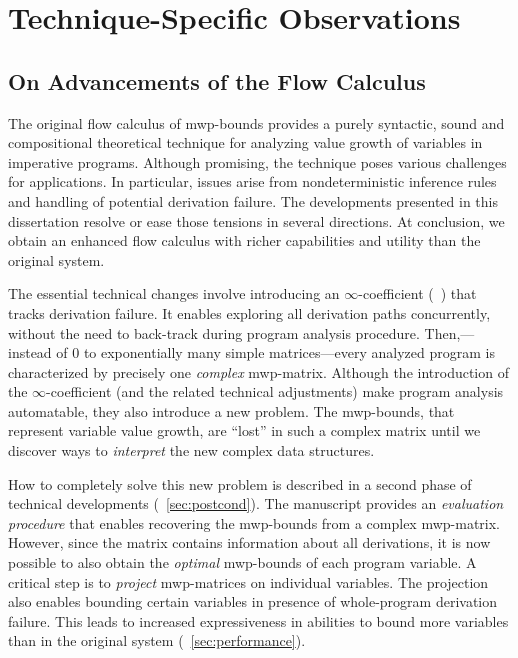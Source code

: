 
\section{Technique-Specific Observations}
\label{sec:res-specific}

\subsection{On Advancements of the Flow Calculus}
\label{subsec:res-flow-calc}

The original flow calculus of mwp-bounds provides a purely syntactic, sound and compositional theoretical technique for analyzing value growth of variables in imperative programs.
Although promising, the technique poses various challenges for applications.
In particular, issues arise from nondeterministic inference rules and handling of potential derivation failure.
The developments presented in this dissertation resolve or ease those tensions in several directions.
At conclusion, we obtain an enhanced flow calculus with richer capabilities and utility than the original system.

The essential technical changes involve introducing an \(\infty\)-coefficient (\cf~) that tracks derivation failure.
It enables exploring all derivation paths {concurrently}, \ie without the need to back-track during program analysis procedure.
Then,---instead of 0 to exponentially many simple matrices---every analyzed program is characterized by precisely one \emph{complex} mwp-matrix.
Although the introduction of the \(\infty\)-coefficient (and the related technical adjustments) make program analysis automatable,
they also introduce a new problem.
The mwp-bounds, that represent variable value growth, are \enquote{lost} in such a complex matrix until
we discover ways to \emph{interpret} the new complex data structures.

How to completely solve this new problem is described in a second phase of technical developments (\cf~\autoref{sec:postcond}).
The manuscript provides an \emph{evaluation procedure} that enables recovering the mwp-bounds from a complex mwp-matrix.
However, since the matrix contains information about all derivations, it is now possible to also obtain the \emph{optimal} mwp-bounds of each program variable.
A critical step is to \emph{project} mwp-matrices on individual variables.
The projection also enables bounding certain variables in presence of whole-program derivation failure.
This leads to increased expressiveness in abilities to bound more variables than in the original system (\cf~\autoref{sec:performance}).

